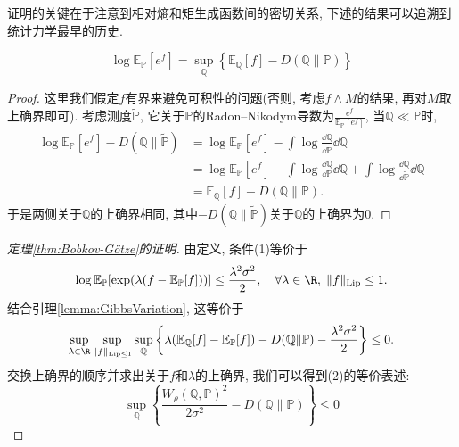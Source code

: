 证明的关键在于注意到相对熵和矩生成函数间的密切关系, 下述的结果可以追溯到统计力学最早的历史. 
\begin{lemma}[Gibbs变分原理]\label{lemma:GibbsVariation}
	\begin{equation*}
		\log \mathbb{E}_{\mathbb{P}}[e^f] = \sup_{\mathbb{Q}} \left\{ \mathbb{E}_{\mathbb{Q}} [f] - D(\mathbb{Q} \| \mathbb{P}) \right\}
	\end{equation*}
\end{lemma}
\begin{proof}
	这里我们假定$f$有界来避免可积性的问题(否则, 考虑$f \wedge M$的结果, 再对$M$取上确界即可). 
	考虑测度$\tilde{\mathbb{P}}$, 它关于$\mathbb{P}$的Radon–Nikodym导数为$\frac{e^{f}}{\mathbb{E}_{\mathbb{P}}[e^{f}]}$, 当$\mathbb{Q} \ll \mathbb{P}$时, 
	\begin{align*}
		\log \mathbb{E}_{\mathbb{P}}[e^f] - D(\mathbb{Q} \| \tilde{\mathbb{P}})
		&= \log \mathbb{E}_{\mathbb{P}}[e^f] - \int \log \frac{\dd \mathbb{Q}}{\dd \tilde{\mathbb{P}}} \dd \mathbb{Q} \\
		&= \log \mathbb{E}_{\mathbb{P}}[e^f] - \int \log \frac{\dd \mathbb{Q}}{\dd \mathbb{P}} \dd \mathbb{Q} + \int \log \frac{\dd \mathbb{Q}}{\dd \tilde{\mathbb{P}}} \dd \mathbb{Q} \\
		&= \mathbb{E}_{\mathbb{Q}}[f] - D(\mathbb{Q} \| \mathbb{P}). 
	\end{align*}
	于是两侧关于$\mathbb{Q}$的上确界相同, 其中$- D(\mathbb{Q} \| \tilde{\mathbb{P}})$关于$\mathbb{Q}$的上确界为$0$.   
\end{proof}

\begin{proof}[\keben 定理\ref{thm:Bobkov-Götze}的证明]
	由定义, 条件(1)等价于
	\begin{equation*}
		\log \mathbb{E}_{\mathbb{P}} [\exp(\lambda(f - \mathbb{E}_{\mathbb{P}}[f]))] \leq \frac{\lambda^2 \sigma^2}{2}, 
		\quad \forall \lambda \in \R,\; \|f\|_{\text{Lip}} \leq 1. 
	\end{equation*}
	结合引理\ref{lemma:GibbsVariation}, 这等价于
	\begin{equation*}
		\sup_{\lambda \in \R} \sup_{\|f\|_{\text{Lip} \leq 1}} \sup_{\mathbb{Q}} \left\{\lambda(\mathbb{E}_{\mathbb{Q}}[f] - \mathbb{E}_{\mathbb{P}}[f]) - D(\mathbb{Q} \| \mathbb{P}) -  \frac{\lambda^2 \sigma^2}{2} \right\} \leq 0. 
	\end{equation*}
	交换上确界的顺序并求出关于$f$和$\lambda$的上确界, 我们可以得到(2)的等价表述: 
	\begin{equation*}
		\sup_{\mathbb{Q}} \left\{\frac{W_{\rho}(\mathbb{Q}, \mathbb{P})^2}{2 \sigma^2} - D(\mathbb{Q} \| \mathbb{P}) \right\} \leq 0
	\end{equation*}
\end{proof}

